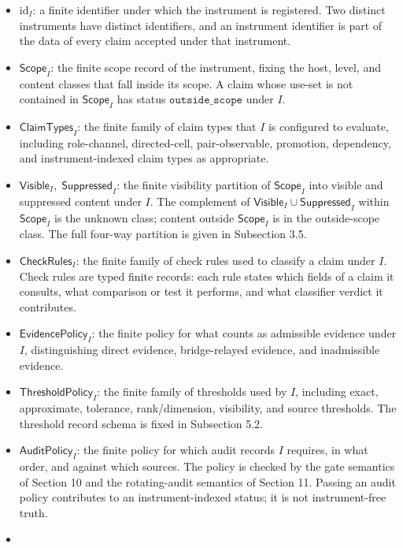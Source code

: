 \documentclass[11pt]{article}
\providecommand{\tightlist}{}
\theoremstyle{definition}
\begin{document}
\begin{itemize}
\tightlist
\item
  \(\mathrm{id}_I\): a finite identifier under which the instrument is registered. Two distinct instruments have distinct identifiers, and an instrument identifier is part of the data of every claim accepted under that instrument.
\item
  \(\mathsf{Scope}_I\): the finite scope record of the instrument, fixing the host, level, and content classes that fall inside its scope. A claim whose use-set is not contained in \(\mathsf{Scope}_I\) has status \(\texttt{outside\_scope}\) under \(I\).
\item
  \(\mathsf{ClaimTypes}_I\): the finite family of claim types that \(I\) is configured to evaluate, including role-channel, directed-cell, pair-observable, promotion, dependency, and instrument-indexed claim types as appropriate.
\item
  \(\mathsf{Visible}_I,\;\mathsf{Suppressed}_I\): the finite visibility partition of \(\mathsf{Scope}_I\) into visible and suppressed content under \(I\). The complement of \(\mathsf{Visible}_I\cup\mathsf{Suppressed}_I\) within \(\mathsf{Scope}_I\) is the unknown class; content outside \(\mathsf{Scope}_I\) is in the outside-scope class. The full four-way partition is given in Subsection 3.5.
\item
  \(\mathsf{CheckRules}_I\): the finite family of check rules used to classify a claim under \(I\). Check rules are typed finite records: each rule states which fields of a claim it consults, what comparison or test it performs, and what classifier verdict it contributes.
\item
  \(\mathsf{EvidencePolicy}_I\): the finite policy for what counts as admissible evidence under \(I\), distinguishing direct evidence, bridge-relayed evidence, and inadmissible evidence.
\item
  \(\mathsf{ThresholdPolicy}_I\): the finite family of thresholds used by \(I\), including exact, approximate, tolerance, rank/dimension, visibility, and source thresholds. The threshold record schema is fixed in Subsection 5.2.
\item
  \(\mathsf{AuditPolicy}_I\): the finite policy for which audit records \(I\) requires, in what order, and against which sources. The policy is checked by the gate semantics of Section 10 and the rotating-audit semantics of Section 11. Passing an audit policy contributes to an instrument-indexed status; it is not instrument-free truth.
\item

\end{itemize}
\end{document}
